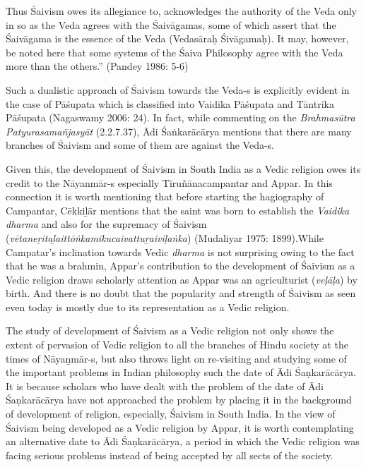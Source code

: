 \begin{myquote}
Thus Śaivism owes its allegiance to, acknowledges the authority of the Veda only in so as the Veda agrees with the Śaivāgamas, some of which assert that the Śaivāgama is the essence of the Veda (Vedasāraḥ Śivāgamaḥ). It may, however, be noted here that some systems of the Śaiva Philosophy agree with the Veda more than the others.” (Pandey 1986: 5-6)
\end{myquote}

\vskip 1pt

Such a dualistic approach of Śaivism towards the Veda-s is explicitly evident in the case of Pāśupata which is classified into Vaidika Pāśupata and Tāntrika Pāśupata (Nagaswamy 2006: 24). In fact, while commenting on the \textit{Brahmasūtra Patyurasamañjasyāt} (2.2.7.37), Ādi Śaṅkarācārya mentions that there are many branches of Śaivism and some of them are against the Veda-s.

\vskip 1pt

Given this, the development of Śaivism in South India as a Vedic religion owes its credit to the Nāyanmār-s especially Tiruñānacampantar and Appar. In this connection it is worth mentioning that before starting the hagiography of Campantar, Cēkkiḻār mentions that the saint was born to establish the \textit{Vaidika dharma }and also for the supremacy of Śaivism (\textit{vētaneṟitaḻaittōṅkamikucaivattuṟaiviḷaṅka}) (Mudaliyar 1975: 1899).While Campatar’s inclination towards Vedic \textit{dharma} is not surprising owing to the fact that he was a brahmin, Appar’s contribution to the development of Śaivism as a Vedic religion draws scholarly attention as Appar was an agriculturist (\textit{veḷāḷa}) by birth. And there is no doubt that the popularity and strength of Śaivism as seen even today is mostly due to its representation as a Vedic religion.

\vskip 1pt

The study of development of Śaivism as a Vedic religion not only shows the extent of pervasion of Vedic religion to all the branches of Hindu society at the times of Nāyaṉmār-s, but also throws light on re-visiting and studying some of the important problems in Indian philosophy such the date of Ādi Śaṇkarācārya. It is because scholars who have dealt with the problem of the date of Ādi Śaṇkarācārya have not approached the problem by placing it in the background of development of religion, especially, Śaivism in South India. In the view of Śaivism being developed as a Vedic religion by Appar, it is worth contemplating an alternative date to Ādi Śaṇkarācārya, a period in which the Vedic religion was facing serious problems instead of being accepted by all sects of the society.


